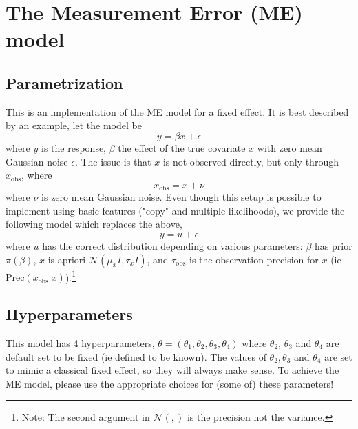 \documentclass[a4paper,11pt]{article}
\begin{document}
\section*{The Measurement Error (ME) model}

\subsection*{Parametrization}

This is an implementation of the ME model for a fixed
effect. It is best described by an example, let  the model be
\begin{displaymath}
    y = \beta x + \epsilon{}
\end{displaymath}
where $y$ is the response, $\beta$ the effect of the true covariate
$x$ with zero mean Gaussian noise $\epsilon$. The issue is that $x$ is not observed
directly, but only through $x_{\text{obs}}$, where
\begin{displaymath}
    x_{\text{obs}} = x + \nu{}
\end{displaymath}
where $\nu$ is zero mean Gaussian noise. Even though this setup is
possible to implement using basic features ("copy" and multiple
likelihoods), we provide the following model which replaces the above,
\begin{displaymath}
    y = u + \epsilon{}
\end{displaymath}
where $u$ has the correct distribution depending on various parameters:
$\beta$ has prior $\pi(\beta)$, $x$ is apriori ${\mathcal N}(\mu_{x}
{I}, \tau_{x} {I})$, and $\tau_{\text{obs}}$ is the observation
precision for $x$ (ie $\text{Prec}(x_{\text{obs}}|x)$).\footnote{Note:
    The second argument in ${\mathcal N}(,)$ is the precision not the
    variance.}



\subsection*{Hyperparameters}

This model has 4 hyperparameters, $\theta = (\theta_{1}, \theta_{2},
\theta_{3}, \theta_{4})$ where $\theta_{2}$, $\theta_{3}$ and
$\theta_{4}$ are default set to be fixed (ie defined to be known). The
values of $\theta_{2}, \theta_{3}$ and $\theta_{4}$ are set to mimic a
classical fixed effect, so they will always make sense. To achieve the
ME model, please use the appropriate choices for
(some of) these parameters!
\end{document}
